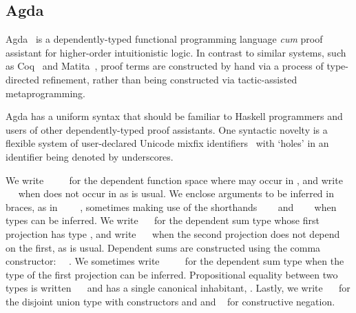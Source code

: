 \subsection{Agda}
\label{subsect.agda}

Agda~\cite{norell_dependently_2009} is a dependently-typed functional programming language \emph{cum} proof assistant for higher-order intuitionistic logic.
In contrast to similar systems, such as Coq~\cite{bertot_short_2008} and Matita~\cite{asperti_matita_2011}, proof terms are constructed by hand via a process of type-directed refinement, rather than being constructed via tactic-assisted metaprogramming.

Agda has a uniform syntax that should be familiar to Haskell programmers and users of other dependently-typed proof assistants.
One syntactic novelty is a flexible system of user-declared Unicode mixfix identifiers~\cite{danielsson_parsing_2011} with `holes' in an identifier being denoted by underscores.

We write \AgdaSymbol{(}~\AgdaSymbol{:}~\AgdaSymbol{)}~~ for the dependent function space where  may occur in , and write ~~ when  does not occur in  as is usual.
We enclose arguments to be inferred in braces, as in \AgdaSymbol{\{}~\AgdaSymbol{:}~\AgdaSymbol{\}}~~, sometimes making use of the shorthands ~~~ and ~\AgdaSymbol{\{}\AgdaSymbol{\}}~~ when types can be inferred.
We write ~~ for the dependent sum type whose first projection has type , and write ~~ when the second projection does not depend on the first, as is usual.
Dependent sums are constructed using the comma constructor: ~\AgdaInductiveConstructor{,}~.
We sometimes write ~~~~ for the dependent sum type when the type of the first projection can be inferred.
Propositional equality between two types is written ~~ and has a single canonical inhabitant, .
Lastly, we write ~~ for the disjoint union type with constructors  and  and ~ for constructive negation.

